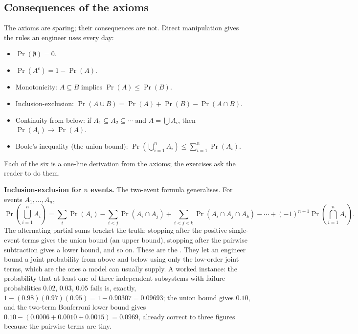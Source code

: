 \subsection{Consequences of the axioms}

The axioms are sparing; their consequences are not. Direct
manipulation gives the rules an engineer uses every day:

\begin{itemize}[leftmargin=*]
  \item $\Pr(\emptyset) = 0$.
  \item $\Pr(A^{c}) = 1 - \Pr(A)$.
  \item Monotonicity: $A \subseteq B$ implies $\Pr(A) \leq \Pr(B)$.
  \item Inclusion-exclusion: $\Pr(A \cup B) = \Pr(A) + \Pr(B) -
    \Pr(A \cap B)$.
  \item Continuity from below: if $A_{1} \subseteq A_{2} \subseteq
    \cdots$ and $A = \bigcup A_{i}$, then $\Pr(A_{i}) \to \Pr(A)$.
  \item Boole's inequality (the union bound):
    $\Pr\left(\bigcup_{i=1}^{n} A_{i}\right) \leq \sum_{i=1}^{n}
    \Pr(A_{i})$.
\end{itemize}

Each of the six is a one-line derivation from the axioms; the
exercises ask the reader to do them.

\begin{mastery}
\textbf{Inclusion-exclusion for $n$ events.} The two-event formula
generalises. For events $A_{1}, \ldots, A_{n}$,
\[
\Pr\!\left(\bigcup_{i=1}^{n} A_{i}\right) =
\sum_{i} \Pr(A_{i})
- \sum_{i < j} \Pr(A_{i} \cap A_{j})
+ \sum_{i < j < k} \Pr(A_{i} \cap A_{j} \cap A_{k})
- \cdots
+ (-1)^{n+1} \Pr\!\left(\bigcap_{i=1}^{n} A_{i}\right).
\]
The alternating partial sums bracket the truth: stopping after the
positive single-event terms gives the union bound (an upper bound),
stopping after the pairwise subtraction gives a lower bound, and so
on. These are the . They let an
engineer bound a joint probability from above and below using only
the low-order joint terms, which are the ones a model can usually
supply. A worked instance: the probability that at least one of
three independent subsystems with failure probabilities $0.02$,
$0.03$, $0.05$ fails is, exactly,
$1 - (0.98)(0.97)(0.95) = 1 - 0.90307 = 0.09693$; the union bound
gives $0.10$, and the two-term Bonferroni lower bound gives
$0.10 - (0.0006 + 0.0010 + 0.0015) = 0.0969$, already correct to
three figures because the pairwise terms are tiny.
\end{mastery}

